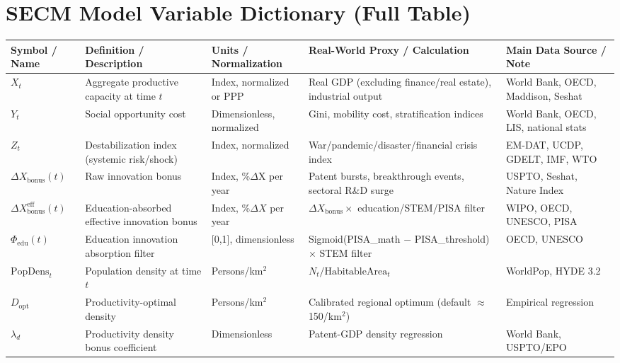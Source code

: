 \documentclass[12pt]{article}
\begin{document}
\section*{SECM Model Variable Dictionary (Full Table)}

\begin{longtable}{|p{2.8cm}|p{4.3cm}|p{2.0cm}|p{3.0cm}|p{3.0cm}|}
\hline
\textbf{Symbol / Name} & \textbf{Definition / Description} & \textbf{Units / Normalization} & \textbf{Real-World Proxy / Calculation} & \textbf{Main Data Source / Note} \\
\hline
\endfirsthead

$X_t$ & Aggregate productive capacity at time $t$ & Index, normalized or PPP & Real GDP (excluding finance/real estate), industrial output & World Bank, OECD, Maddison, Seshat \\
$Y_t$ & Social opportunity cost & Dimensionless, normalized & Gini, mobility cost, stratification indices & World Bank, OECD, LIS, national stats \\
$Z_t$ & Destabilization index (systemic risk/shock) & Index, normalized & War\slash pandemic\slash disaster\slash financial crisis index & EM-DAT, UCDP, GDELT, IMF, WTO \\
$\Delta X_{\text{bonus}}(t)$ & Raw innovation bonus & Index, \%$\Delta$X per year & Patent bursts, breakthrough events, sectoral R\&D surge & USPTO, Seshat, Nature Index \\
$\Delta X_{\text{bonus}}^{\text{eff}}(t)$ & Education-absorbed effective innovation bonus & Index, \%$\Delta X$ per year & $\Delta X_{\text{bonus}} \times$ education/STEM/PISA filter & WIPO, OECD, UNESCO, PISA \\
$\Phi_{\text{edu}}(t)$ & Education innovation absorption filter & [0,1], dimensionless & Sigmoid(PISA\_math $-$ PISA\_threshold) $\times$ STEM filter & OECD, UNESCO \\
$\text{PopDens}_t$ & Population density at time $t$ & Persons/km$^2$ & $N_t / \text{HabitableArea}_t$ & WorldPop, HYDE 3.2 \\
$D_{\text{opt}}$ & Productivity-optimal density & Persons/km$^2$ & Calibrated regional optimum (default $\approx$ 150/km$^2$) & Empirical regression \\
$\lambda_d$ & Productivity density bonus coefficient & Dimensionless & Patent-GDP density regression & World Bank, USPTO/EPO \\

\end{longtable}
\end{document}
